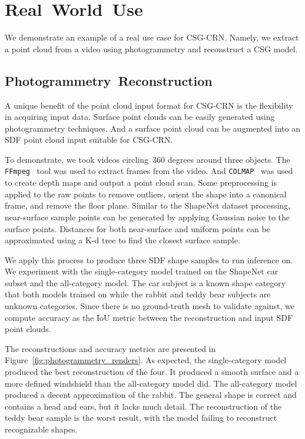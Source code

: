 
\chapter{Real~World~Use}
\label{chap:real_world_use}

We demonstrate an example of a real use case for CSG-CRN. Namely, we extract a point cloud from a video using photogrammetry and reconstruct a CSG model.

\section{Photogrammetry~Reconstruction}
\label{sec:photogrammetry_reconstruction}

A unique benefit of the point cloud input format for CSG-CRN is the flexibility in acquiring input data. Surface point clouds can be easily generated using photogrammetry techniques. And a surface point cloud can be augmented into an SDF point cloud input suitable for CSG-CRN.

To demonstrate, we took videos circling~360 degrees around three objects. The \texttt{FFmpeg}~\cite{FFmpeg2026} tool was used to extract frames from the video. And \texttt{COLMAP}~\cite{schoenberger2016sfm} was used to create depth maps and output a point cloud scan. Some preprocessing is applied to the raw points to remove outliers, orient the shape into a canonical frame, and remove the floor plane. Similar to the ShapeNet dataset processing, near-surface sample points can be generated by applying Gaussian noise to the surface points. Distances for both near-surface and uniform points can be approximated using a K-d tree to find the closest surface sample.

We apply this process to produce three SDF shape samples to run inference on. We experiment with the single-category model trained on the ShapeNet car subset and the all-category model. The car subject is a known shape category that both models trained on while the rabbit and teddy bear subjects are unknown categories. Since there is no ground-truth mesh to validate against, we compute accuracy as the IoU metric between the reconstruction and input SDF point clouds.

The reconstructions and accuracy metrics are presented in Figure~\ref{fig:photogrammetry_renders}. As expected, the single-category model produced the best reconstruction of the four. It produced a smooth surface and a more defined windshield than the all-category model did. The all-category model produced a decent approximation of the rabbit. The general shape is correct and contains a head and ears, but it lacks much detail. The reconstruction of the teddy bear sample is the worst result, with the model failing to reconstruct recognizable shapes.


